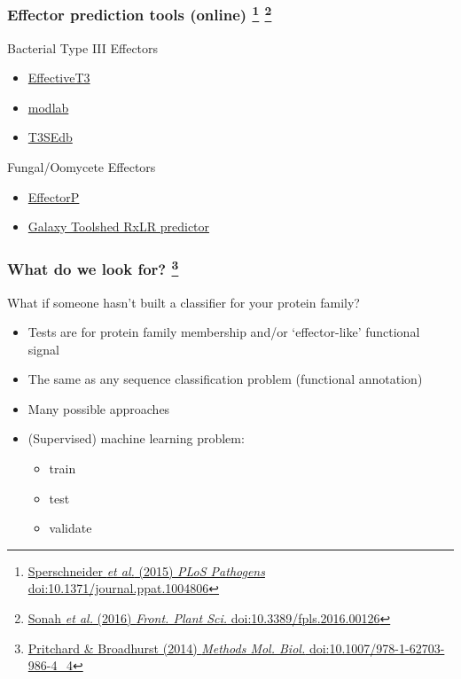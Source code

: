 \begin{frame}
  \frametitle{Effector prediction tools (online)
  \footnote{\tiny{\href{http://dx.doi.org/10.1371/journal.ppat.1004806}{Sperschneider \textit{et al.} (2015) \textit{PLoS Pathogens} doi:10.1371/journal.ppat.1004806}}}
  \footnote{\tiny{\href{http://dx.doi.org/10.3389/fpls.2016.00126}{Sonah \textit{et al.} (2016) \textit{Front. Plant Sci.} doi:10.3389/fpls.2016.00126}}}
  }
  \begin{alertblock}{Bacterial Type III Effectors}
    \begin{itemize}
      \item \textcolor{hutton_purple}{\href{http://www.effectors.org/method/effectivet3}{EffectiveT3}}
      \item \textcolor{hutton_purple}{\href{http://gecco.org.chemie.uni-frankfurt.de/T3SS_prediction/T3SS_prediction.html}{modlab}}
      \item \textcolor{hutton_purple}{\href{http://effectors.bic.nus.edu.sg/T3SEdb/predict.php}{T3SEdb}}
    \end{itemize}
  \end{alertblock}
  \begin{block}{Fungal/Oomycete Effectors}
    \begin{itemize}
      \item \textcolor{hutton_purple}{\href{http://effectorp.csiro.au/}{EffectorP}}
      \item \textcolor{hutton_purple}{\href{http://bit.ly/1XHf0kM}{Galaxy Toolshed RxLR predictor}}
    \end{itemize}
  \end{block}
\end{frame}


\begin{frame}
  \frametitle{What do we look for?
  \footnote{\tiny{\href{http://dx.doi.org/10.1007/978-1-62703-986-4_4}{Pritchard \& Broadhurst (2014) \textit{Methods Mol. Biol.} doi:10.1007/978-1-62703-986-4\_4}}}
  }
  What if someone hasn't built a classifier for your protein family?
      \begin{itemize}  
        \item \textcolor{hutton_green}{Tests are for protein family membership and/or `effector-like' functional signal}
        \item \textcolor{hutton_blue}{The same as any sequence classification problem (functional annotation)}
        \item \textcolor{hutton_purple}{Many possible approaches}
        \item \textcolor{RawSienna}{(Supervised) machine learning problem:}
        \begin{itemize}
          \item train
          \item test
          \item validate
        \end{itemize}
      \end{itemize}
\end{frame}

